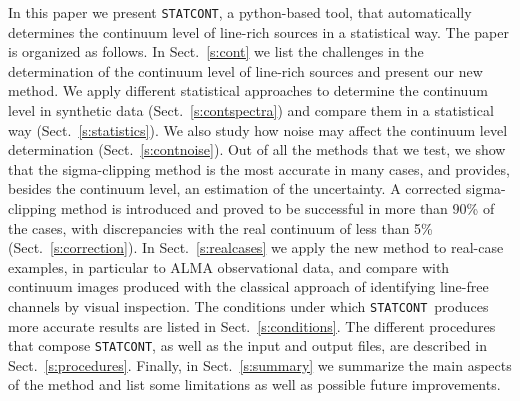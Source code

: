 \documentclass{aa}
\newcommand{\statcont} {\texttt{STATCONT}}
\begin{document}
In this paper we present \statcont, a python-based tool, that automatically determines the continuum level of line-rich sources in a statistical way. The paper is organized as follows. In Sect.~\ref{s:cont} we list the challenges in the determination of the continuum level of line-rich sources and present our new method. We apply different statistical approaches to determine the continuum level in synthetic data (Sect.~\ref{s:contspectra}) and compare them in a statistical way (Sect.~\ref{s:statistics}).  We also study how noise may affect the continuum level determination (Sect.~\ref{s:contnoise}). Out of all the methods that we test, we show that the sigma-clipping method is the most accurate in many cases, and provides, besides the continuum level, an estimation of the uncertainty. A corrected sigma-clipping method is introduced and proved to be successful in more than 90\% of the cases, with discrepancies with the real continuum of less than 5\% (Sect.~\ref{s:correction}). In Sect.~\ref{s:realcases} we apply the new method to real-case examples, in particular to ALMA observational data, and compare with continuum images produced with the classical approach of identifying line-free channels by visual inspection. The conditions under which \statcont\ produces more accurate results are listed in Sect.~\ref{s:conditions}. The different procedures that compose \statcont, as well as the input and output files, are described in Sect.~\ref{s:procedures}. Finally, in Sect.~\ref{s:summary} we summarize the main aspects of the method and list some limitations as well as possible future improvements.
\end{document}
